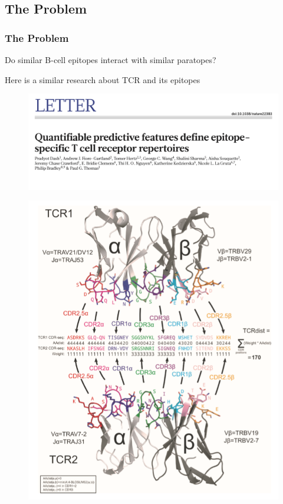 \documentclass[hyperref={pdfpagelabels=false}]{beamer}
\begin{document}
\subsection{The Problem}
\begin{frame}
\frametitle{The Problem} 
Do similar B-cell epitopes interact with similar paratopes?
\vspace{0.3cm}

Here is a similar research about TCR and its epitopes

\begin{figure}
	\centering
	\includegraphics[scale=0.2]{Quantifiable_TCR}
\end{figure}

\begin{figure}
	\centering
	\includegraphics[scale=0.3]{figure9}
\end{figure}
\end{frame}
\end{document}
